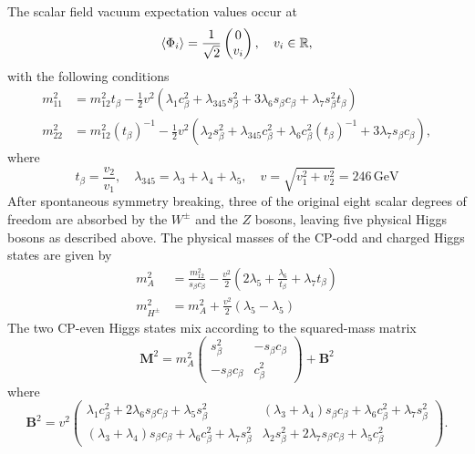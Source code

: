 The scalar field vacuum expectation values occur at 
\begin{equation}
    \label{4.3}
    \expval{\Phi_i} = \frac{1}{\sqrt{2}}\begin{pmatrix}
        0 \\ v_i
    \end{pmatrix},\quad v_i \in \mathbb{R},
\end{equation}
with the following conditions
\begin{equation}
    \label{4.4}
    \begin{split}
        m_{11}^2 &= m_{12}^2 t_{\beta} - \frac{1}{2}v^2(\lambda_1  c^2_{\beta} + \lambda_{345} s^2_{\beta} + 3\lambda_6 s_{\beta} c_{\beta} + \lambda_7  s^2_{\beta} t_{\beta})  \\
        m_{22}^2 &= m_{12}^2( t_{\beta})^{-1} - \frac{1}{2}v^2(\lambda_2  s^2_{\beta} + \lambda_{345} c^2_{\beta} + \lambda_6 c^2_{\beta}( t_{\beta})^{-1} + 3\lambda_7  s_{\beta} c_{\beta}  ),
    \end{split}
\end{equation}
where 
$$ t_{\beta}=\frac{v_2}{v_1}, \quad \lambda_{345} = \lambda_3+\lambda_4+\lambda_5, \quad v = \sqrt{v_1^2 + v_2^2} = 246\, \mathrm{GeV}$$
After spontaneous symmetry breaking, three of the original eight scalar degrees of freedom are absorbed by the $W^{\pm}$ and the $Z$ bosons, leaving five physical Higgs bosons as described above. The physical masses of the CP-odd and charged Higgs states are given by 
\begin{equation}
    \label{4.5}
    \begin{split}
        m^2_{A} &= \frac{m_{12}^2}{ s_{\beta} c_{\beta}} - \frac{v^2}{2}\left( 2\lambda_5 + \frac{\lambda_6}{ t_{\beta}} + \lambda_7  t_{\beta}  \right) \\ 
        m^2_{H^{\pm}} &= m_{A}^2 + \frac{v^2}{2}(\lambda_5 - \lambda_5)
    \end{split}
\end{equation}
The two CP-even Higgs states mix according to the squared-mass matrix 
\begin{equation}
    \label{4.6}
    \mathbf{M}^2 = m^2_{A}\begin{pmatrix}
         s^2_{\beta} & - s_{\beta}  c_{\beta} \\
        - s_{\beta} c_{\beta} &  c^2_{\beta} 
    \end{pmatrix} + \mathbf{B}^2
\end{equation}
where
$$\mathbf{B}^2 = v^2\begin{pmatrix}
    \lambda_1 c^2_{\beta} + 2 \lambda_6 s_{\beta} c_{\beta} + \lambda_5 s^2_{\beta}  & (\lambda_3+\lambda_4) s_{\beta} c_{\beta} + \lambda_6 c^2_{\beta} + \lambda_7  s^2_{\beta} \\
    (\lambda_3 + \lambda_4) s_{\beta} c_{\beta} + \lambda_6 c^2_{\beta} + \lambda_7 s^2_{\beta} & \lambda_2 s^2_{\beta} + 2 \lambda_7 s_{\beta} c_{\beta} + \lambda_5 c^2_{\beta} 
\end{pmatrix}.$$
